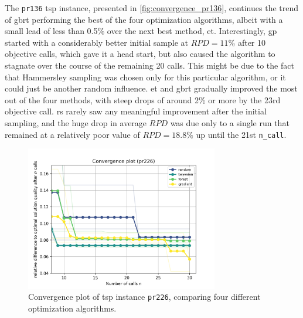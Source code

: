 The \texttt{pr136} \gls{tsp} instance, presented in \cref{fig:convergence_pr136}, continues the trend of \gls{gbrt} performing the best of the four optimization algorithms, albeit with a small lead of less than 0.5\% over the next best method, \gls{et}. Interestingly, \gls{gp} started with a considerably better initial sample at $RPD = 11\%$ after 10 objective calls, which gave it a head start, but also caused the algorithm to stagnate over the course of the remaining 20 calls. This might be due to the fact that Hammersley sampling was chosen only for this particular algorithm, or it could just be another random influence. \gls{et} and \gls{gbrt} gradually improved the most out of the four methods, with steep drops of around 2\% or more by the 23rd objective call. \gls{rs} rarely saw any meaningful improvement after the initial sampling, and the huge drop in average $RPD$ was due only to a single run that remained at a relatively poor value of $RPD = 18.8\%$ up until the 21st \texttt{n\_call}.

\begin{figure}[h]
	\centering
	\includegraphics[width=0.75\textwidth]{results/part1/convergence_pr226.png}
	\caption[Convergence plot of \gls{tsp} instance \texttt{pr226}]{Convergence plot of \gls{tsp} instance \texttt{pr226}, comparing four different optimization algorithms.}
	\label{fig:convergence_pr226}
\end{figure}

